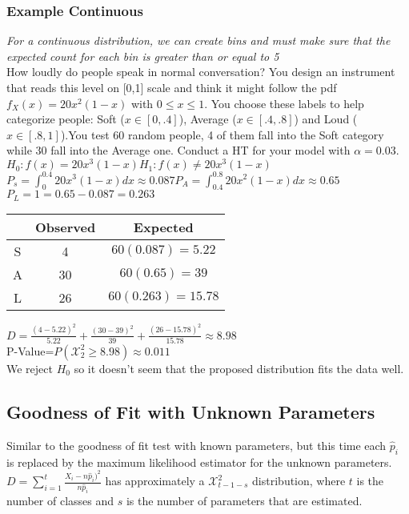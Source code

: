 \documentclass{article}
\begin{document}
\subsubsection{Example Continuous}
 \textit{For a continuous distribution, we can create bins and must make sure that the expected count for each bin is greater than or equal to 5}\\
 How loudly do people speak in normal conversation? You design an instrument that reads this level on [0,1] scale and think it might follow the pdf $f_X(x)=20x^2(1-x)$ with $0\leq x\leq 1$. You choose these labels to help categorize people: Soft ($x\in[0,.4]$), Average ($x\in[.4,.8]$) and Loud ($x\in[.8,1]$).You test 60 random people, 4 of them fall into the Soft category while 30 fall into the Average one. Conduct a HT for your model with $\alpha = 0.03$.\\
 $H_0:f(x)=20x^3(1-x)$\hspace*{0.25in}$H_1:f(x)\neq20x^3(1-x)$\\
 $P_s=\int_0^{0.4}20x^3(1-x)dx\approx0.087$\hspace*{0.25in}$P_A=\int_{0.4}^{0.8}20x^2(1-x)dx\approx0.65$\hspace*{0.25in}$P_L=1=0.65-0.087=0.263$\\
 \begin{center}
    \begin{tabular}{c|c|c}
        &Observed & Expected \\
        \hline
        S& 4 & $60(0.087)=5.22$\\
        \hline
        A& 30 & $60(0.65)=39$\\
        \hline
        L& 26 & $60(0.263)=15.78$\\
    \end{tabular}
\end{center}
$D=\frac{(4-5.22)^2}{5.22}+\frac{(30-39)^2}{39}+\frac{(26-15.78)^2}{15.78}\approx8.98$\\
P-Value=$P(\mathcal{X}^2_2\geq8.98)\approx0.011$\\
We reject $H_0$ so it doesn't seem that the proposed distribution fits the data well.
\subsection{Goodness of Fit with Unknown Parameters}
\label{sec:goodUnknown}
Similar to the goodness of fit test with known parameters, but this time each $\hat p_i$ is replaced by the maximum likelihood estimator for the unknown parameters. $D=\sum_{i=1}^t\frac{X_i-n\hat p_i)^2}{n\hat p_i}$ has approximately a $\mathcal{X}^2_{t-1-s}$ distribution, where $t$ is the number of classes and $s$ is the number of parameters that are estimated.
\end{document}
